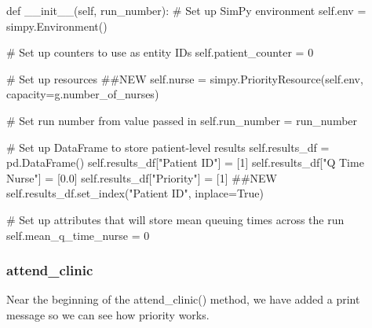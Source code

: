 \documentclass[
  letterpaper,
  DIV=11,
  numbers=noendperiod]{scrreprt}
\newenvironment{Shaded}{}{}
\newcommand{\CommentTok}[1]{\textcolor[rgb]{0.42,0.45,0.49}{#1}}
\newcommand{\DecValTok}[1]{\textcolor[rgb]{0.00,0.36,0.77}{#1}}
\newcommand{\FloatTok}[1]{\textcolor[rgb]{0.00,0.36,0.77}{#1}}
\newcommand{\FunctionTok}[1]{\textcolor[rgb]{0.44,0.26,0.76}{#1}}
\newcommand{\KeywordTok}[1]{\textcolor[rgb]{0.84,0.23,0.29}{#1}}
\newcommand{\NormalTok}[1]{\textcolor[rgb]{0.14,0.16,0.18}{#1}}
\newcommand{\OperatorTok}[1]{\textcolor[rgb]{0.14,0.16,0.18}{#1}}
\newcommand{\StringTok}[1]{\textcolor[rgb]{0.01,0.18,0.38}{#1}}
\newcommand{\VariableTok}[1]{\textcolor[rgb]{0.89,0.38,0.04}{#1}}
\begin{document}
\begin{Shaded}
\begin{Highlighting}[]
\KeywordTok{def} \FunctionTok{\_\_init\_\_}\NormalTok{(}\VariableTok{self}\NormalTok{, run\_number):}
        \CommentTok{\# Set up SimPy environment}
        \VariableTok{self}\NormalTok{.env }\OperatorTok{=}\NormalTok{ simpy.Environment()}

        \CommentTok{\# Set up counters to use as entity IDs}
        \VariableTok{self}\NormalTok{.patient\_counter }\OperatorTok{=} \DecValTok{0}

        \CommentTok{\# Set up resources}
        \CommentTok{\#\#NEW}
        \VariableTok{self}\NormalTok{.nurse }\OperatorTok{=}\NormalTok{ simpy.PriorityResource(}\VariableTok{self}\NormalTok{.env,}
\NormalTok{                                            capacity}\OperatorTok{=}\NormalTok{g.number\_of\_nurses)}

        \CommentTok{\# Set run number from value passed in}
        \VariableTok{self}\NormalTok{.run\_number }\OperatorTok{=}\NormalTok{ run\_number}


        \CommentTok{\# Set up DataFrame to store patient{-}level results}
        \VariableTok{self}\NormalTok{.results\_df }\OperatorTok{=}\NormalTok{ pd.DataFrame()}
        \VariableTok{self}\NormalTok{.results\_df[}\StringTok{"Patient ID"}\NormalTok{] }\OperatorTok{=}\NormalTok{ [}\DecValTok{1}\NormalTok{]}
        \VariableTok{self}\NormalTok{.results\_df[}\StringTok{"Q Time Nurse"}\NormalTok{] }\OperatorTok{=}\NormalTok{ [}\FloatTok{0.0}\NormalTok{]}
        \VariableTok{self}\NormalTok{.results\_df[}\StringTok{"Priority"}\NormalTok{] }\OperatorTok{=}\NormalTok{ [}\DecValTok{1}\NormalTok{] }\CommentTok{\#\#NEW}
        \VariableTok{self}\NormalTok{.results\_df.set\_index(}\StringTok{"Patient ID"}\NormalTok{, inplace}\OperatorTok{=}\VariableTok{True}\NormalTok{)}

        \CommentTok{\# Set up attributes that will store mean queuing times across the run}
        \VariableTok{self}\NormalTok{.mean\_q\_time\_nurse }\OperatorTok{=} \DecValTok{0}
\end{Highlighting}
\end{Shaded}

\subsubsection{attend\_clinic}\label{attend_clinic}

Near the beginning of the attend\_clinic() method, we have added a print
message so we can see how priority works.
\end{document}
